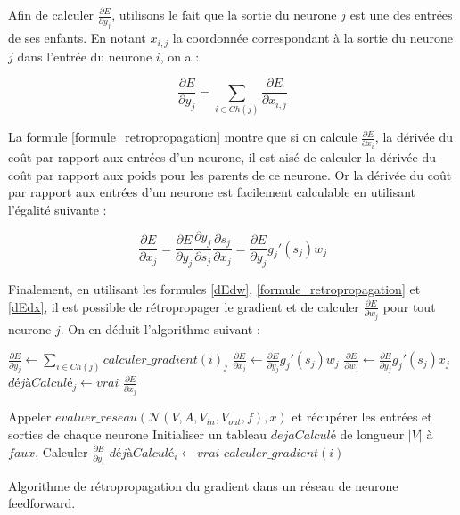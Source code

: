 \documentclass{report}
\begin{document}
Afin de calculer $\frac{\partial E}{\partial y_j}$, utilisons le fait que la sortie du neurone $j$ est une des entrées de ses enfants. En notant $x_{i, j}$ la coordonnée correspondant à la sortie du neurone $j$ dans l'entrée du neurone $i$, on a :

\begin{equation}
\frac{\partial E}{\partial y_j} = \sum_{i \in Ch(j)}{\frac{\partial E}{\partial x_{i,j}}}
\label{formule_retropropagation}
\end{equation}

La formule \ref{formule_retropropagation} montre que si on calcule $\frac{\partial E}{\partial x_i}$, la dérivée du coût par rapport aux entrées d'un neurone, il est aisé de calculer la dérivée du coût par rapport aux poids pour les parents de ce neurone. Or la dérivée du coût par rapport aux entrées d'un neurone est facilement calculable en utilisant l'égalité suivante :

\begin{equation}
\frac{\partial E}{\partial x_j} = \frac{\partial E}{\partial y_j}\frac{\partial y_j}{\partial s_j}\frac{\partial s_j}{\partial x_j} =  \frac{\partial E}{\partial y_j} g_j'(s_j) w_j
\label{dEdx}
\end{equation}

Finalement, en utilisant les formules \ref{dEdw}, \ref{formule_retropropagation} et \ref{dEdx}, il est possible de rétropropager le gradient et de calculer $\frac{\partial E}{\partial w_j}$ pour tout neurone $j$. On en déduit l'algorithme suivant :

\begin{algorithm} 
\begin{algorithmic}
		\State $\frac{\partial E}{\partial y_j} \leftarrow \sum_{i \in Ch(j)}{calculer\_gradient(i)_j}$
		\State $\frac{\partial E}{\partial x_j} \leftarrow \frac{\partial E}{\partial y_j} g_j'(s_j) w_j$
		\State $\frac{\partial E}{\partial w_j} \leftarrow \frac{\partial E}{\partial y_j} g_j'(s_j) x_j$
		\State $déjàCalculé_j \leftarrow vrai$
	\EndIf
	\State \Return $\frac{\partial E}{\partial x_j}$
\EndFunction

\State Appeler $evaluer\_reseau(\mathcal{N}(V, A, V_{in}, V_{out}, f), x)$ et récupérer les entrées et sorties de chaque neurone
\State Initialiser un tableau $dejaCalculé$ de longueur $|V|$ à $faux$.
	\State Calculer $\frac{\partial E}{\partial y_i}$
	\State $déjàCalculé_i \leftarrow vrai$ 
\EndFor
{}
	\State $calculer\_gradient(i)$ 
\EndFor
\EndProcedure
\end{algorithmic} 
\caption{Algorithme de rétropropagation du gradient dans un réseau de neurone feedforward.}
\label{propagation_memoisation2}
\end{algorithm}
\end{document}
